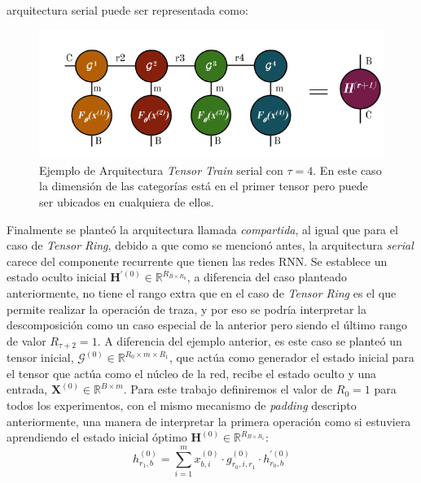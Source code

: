 \documentclass[spanish]{article}
\theoremstyle{definition}
\theoremstyle{remark}
\numberwithin{equation}{section}
\numberwithin{equation}{section} %
\begin{document}
 arquitectura serial puede ser representada como:
\begin{figure}[H]
 \centering
 \includegraphics[width=12cm]{img/ejemplo_arquitectura_serializada_tensor_train.png}
\caption[Arquitectura \textit{Tensor Train} serial]{\footnotesize{Ejemplo de Arquitectura \textit{Tensor Train} serial} con $\tau=4$. En este caso la dimensión de las categorías está en el primer tensor pero puede ser ubicados en cualquiera de ellos. }
\label{fig:arquitecture_serialized_tensor_train}
\end{figure}\par
Finalmente se planteó la arquitectura llamada \textit{compartida}, al igual que para el caso de \textit{Tensor Ring}, debido a que como se mencionó antes, la arquitectura \textit{serial} carece del componente recurrente que tienen las redes RNN. Se establece un estado oculto inicial $\boldsymbol{H}^{\prime(0)} \in \mathbb{R}^{R_{B \times R_0}}$, a diferencia del caso planteado anteriormente, no tiene el rango extra que en el caso de \textit{Tensor Ring} es el que permite realizar la operación de traza,
y por eso se podría interpretar la descomposición como un caso especial de la anterior pero siendo el último rango de valor $R_{\tau+2}=1$. A diferencia del ejemplo anterior, es este caso se planteó un tensor inicial, $\mathcal{G}^{(0)}\in \mathbb{R}^{R_0 \times m \times R_1}$, que actúa como generador el estado inicial para el tensor que actúa como el núcleo de la red, recibe el estado oculto y una entrada, $\boldsymbol{X}^{(0)} \in \mathbb{R}^{B \times m}$. Para este trabajo definiremos el valor de $R_0=1$ para todos los experimentos, con el mismo mecanismo de \textit{padding} descripto anteriormente, una manera de interpretar la primera operación como si estuviera aprendiendo el estado inicial óptimo $\boldsymbol{H}^{(0)} \in \mathbb{R}^{R_{B \times R_1}}$:
\begin{equation}
\label{eq_first_state_learned_tensor_train}
h^{(0)}_{r_{1},b} = \sum^m_{i=1} x^{(0)}_{b,i} \cdot g^{(0)}_{r_{0},i,r_{1}} \cdot  {h}^{\prime(0)}_{r_{0},b} 
\end{equation} \par
\end{document}
